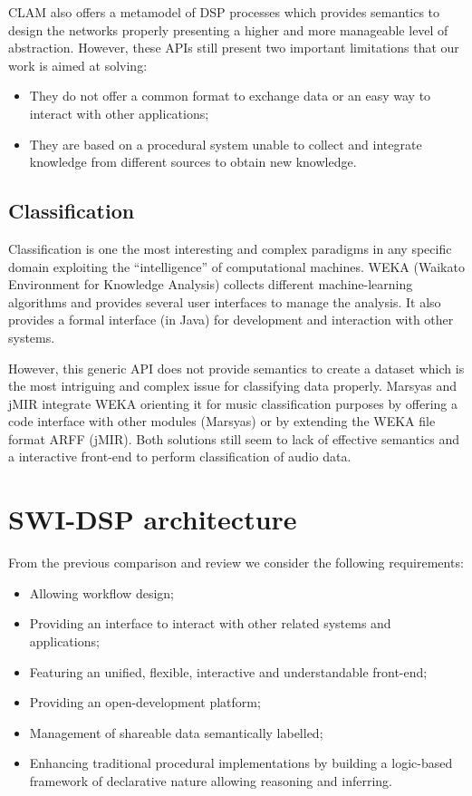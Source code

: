 \documentclass[runningheads]{llncs}
\begin{document}
CLAM also offers a metamodel of DSP processes which provides semantics to design the networks properly presenting a higher and more manageable level of abstraction. However, these APIs still present two important limitations that our work is aimed at solving:

\begin{itemize}
 \item They do not offer a common format to exchange data or an easy way to interact with other applications;
 \item They are based on a procedural system unable to collect and integrate knowledge from different sources to obtain new knowledge.
\end{itemize}

\subsection{Classification}\label{subsec:classif}

Classification is one the most interesting and complex paradigms in any specific domain exploiting the ``intelligence'' of computational machines. WEKA (Waikato Environment for Knowledge Analysis) \cite{weka} collects different machine-learning algorithms and provides several user interfaces to manage the analysis. It also provides a formal interface (in Java) for development and interaction with other systems.

However, this generic API does not provide semantics to create a dataset which is the most intriguing and complex issue for classifying data properly. Marsyas and jMIR integrate WEKA orienting it for music classification purposes by offering a code interface with other modules (Marsyas) or by extending the WEKA file format ARFF (jMIR). Both solutions still seem to lack of effective semantics and a interactive front-end to perform classification of audio data.

\section{SWI-DSP architecture}\label{sec:architecture}

From the previous comparison and review we consider the following requirements:

\begin{itemize}
 \item Allowing workflow design;
 \item Providing an interface to interact with other related systems and applications;
 \item Featuring an unified, flexible, interactive and understandable front-end;
 \item Providing an open-development platform;
 \item Management of shareable data semantically labelled;
 \item Enhancing traditional procedural implementations by building a logic-based framework of declarative nature allowing reasoning and inferring.
\end{itemize}
\end{document}
